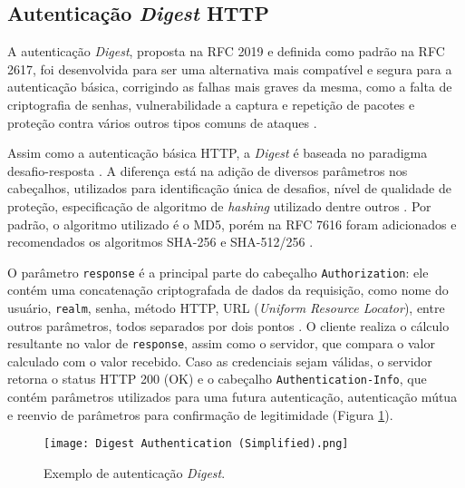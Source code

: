 \subsection{Autenticação \emph{Digest} HTTP}

A autenticação \emph{Digest}, proposta na RFC 2019 \cite{RFC2019} e definida como padrão na RFC 
2617, foi desenvolvida para ser uma alternativa mais compatível e segura para a autenticação básica, 
corrigindo as falhas mais graves da mesma, como a falta de criptografia de senhas, vulnerabilidade a 
captura e repetição de pacotes e proteção contra vários outros tipos comuns de ataques 
\cite{GOURLEY2002}.

Assim como a autenticação básica HTTP, a \emph{Digest} é baseada no paradigma 
desafio-resposta \cite{RFC7616}. A diferença está na adição de diversos parâmetros nos 
cabeçalhos, utilizados para identificação única de desafios, nível de qualidade de proteção, 
especificação de algoritmo de \emph{hashing} utilizado dentre outros \cite{CHAPMAN2012}. Por padrão, 
o algoritmo utilizado é o MD5, porém na RFC 7616 foram adicionados e recomendados os algoritmos 
SHA-256 e SHA-512/256 \cite{RFC7616}.

O parâmetro \texttt{response} é a principal parte do cabeçalho \texttt{Authorization}: ele contém 
uma concatenação criptografada de dados da requisição, como nome do usuário, \texttt{realm}, senha, 
método HTTP, URL (\emph{Uniform Resource Locator}), entre outros parâmetros, todos separados por dois pontos \cite{CHAPMAN2012}. O 
cliente realiza o cálculo resultante no valor de \texttt{response}, assim como o servidor, que 
compara o valor calculado com o valor recebido. Caso as credenciais sejam válidas, o servidor retorna
o status HTTP 200 (OK) e o cabeçalho \texttt{Authentication-Info}, que contém parâmetros utilizados 
para uma futura autenticação, autenticação mútua e reenvio de parâmetros para confirmação de 
legitimidade (Figura \ref{fig:digestAuth}).

\begin{figure}[ht]
  \centering
  \texttt{[image: Digest Authentication (Simplified).png]}
  \caption{Exemplo de autenticação \emph{Digest}.}
  \label{fig:digestAuth}
\end{figure}